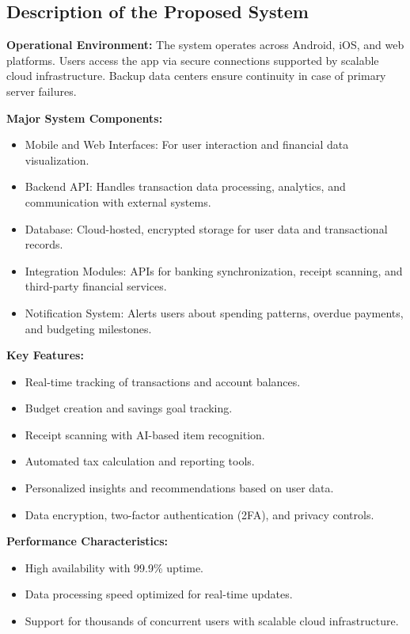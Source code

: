 \subsection{Description of the Proposed System}

\textbf{Operational Environment:}
The system operates across Android, iOS, and web platforms. Users access the app via secure connections supported by scalable cloud infrastructure. Backup data centers ensure continuity in case of primary server failures.

\textbf{Major System Components:}
\begin{itemize}
    \item Mobile and Web Interfaces: For user interaction and financial data visualization.
    \item Backend API: Handles transaction data processing, analytics, and communication with external systems.
    \item Database: Cloud-hosted, encrypted storage for user data and transactional records.
    \item Integration Modules: APIs for banking synchronization, receipt scanning, and third-party financial services.
    \item Notification System: Alerts users about spending patterns, overdue payments, and budgeting milestones.
\end{itemize}

\textbf{Key Features:}
\begin{itemize}
    \item Real-time tracking of transactions and account balances.
    \item Budget creation and savings goal tracking.
    \item Receipt scanning with AI-based item recognition.
    \item Automated tax calculation and reporting tools.
    \item Personalized insights and recommendations based on user data.
    \item Data encryption, two-factor authentication (2FA), and privacy controls.
\end{itemize}

\textbf{Performance Characteristics:}
\begin{itemize}
    \item High availability with 99.9\% uptime.
    \item Data processing speed optimized for real-time updates.
    \item Support for thousands of concurrent users with scalable cloud infrastructure.
\end{itemize}

